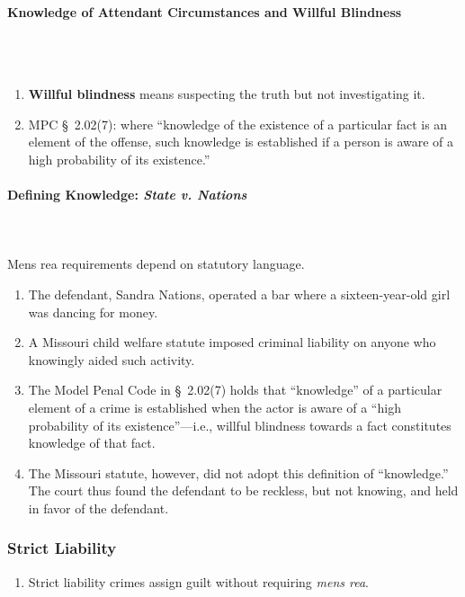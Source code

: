 \paragraph{Knowledge of Attendant Circumstances and Willful Blindness}
~\\\\
\begin{enumerate}
    \item \textbf{Willful blindness} means suspecting the truth but not 
    investigating it.
    \item MPC \S\ 2.02(7): where ``knowledge of the existence of a particular 
    fact is an element of the offense, such knowledge is established if a 
    person is aware of a high probability of its existence.''
\end{enumerate}

\paragraph{Defining Knowledge: \emph{State v. Nations}}
~\\\\
Mens rea requirements depend on statutory language.

\begin{enumerate}
    \item The defendant, Sandra Nations, operated a bar where a 
    sixteen-year-old girl was dancing for money.
    \item A Missouri child welfare statute imposed criminal liability on 
    anyone who knowingly aided such activity.
    \item The Model Penal Code in \S\ 2.02(7) holds that ``knowledge'' of a 
    particular element of a crime is established when the actor is aware of a 
    ``high probability of its existence''---i.e., willful blindness towards a 
    fact constitutes knowledge of that fact.
    \item The Missouri statute, however, did not adopt this definition of 
    ``knowledge.'' The court thus found the defendant to be reckless, but not 
    knowing, and held in favor of the defendant.
\end{enumerate}

\subsubsection{Strict Liability}

\begin{enumerate}
    \item Strict liability crimes assign guilt without requiring \emph{mens 
    rea}.
\end{enumerate}


